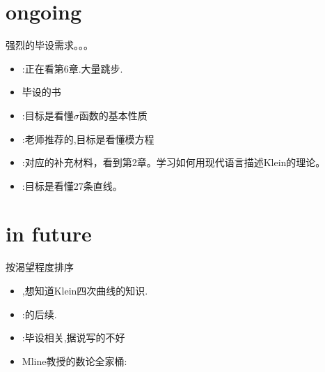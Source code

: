 \documentclass{ctexart}
\begin{document}
\section{ongoing}
强烈的毕设需求。。。
\begin{itemize}
	\item \cite[Chap 1-4]{bruinier20081}:正在看第6章.大量跳步.
	\item \cite{klein2003lectures,klein1892vorlesungen}毕设的书
	\item \cite{mumford1974abelian}:目标是看懂$\sigma$函数的基本性质
	\item \cite{shimura1971introduction}:老师推荐的,目标是看懂模方程
	\item \cite{shurman1997geometry}:对应的补充材料，看到第2章。学习如何用现代语言描述Klein的理论。
	\item \cite{mumford1995algebraic}\cite{reid1988undergraduate}:目标是看懂27条直线。
	
\end{itemize}
\section{in future}
按渴望程度排序
\begin{itemize}
	\item \cite{moduli1991mathematical},想知道Klein四次曲线的知识.
	\item \cite{bruinier20081}:\cite{bruinier20081}的后续.
	\item \cite{fricke1897vorlesungen}:毕设相关,据说写的不好
	\item Mline教授的数论全家桶:\cite{milne2006elliptic,milne1986jacobian,milne2005introduction}
\end{itemize}
\end{document}
